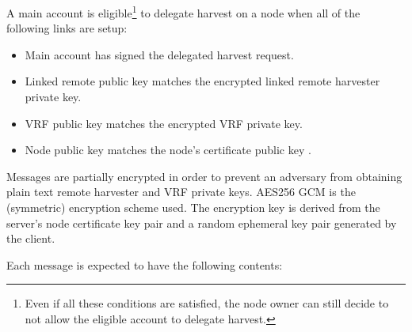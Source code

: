 A main account is eligible\footnote{
	Even if all these conditions are satisfied, the node owner can still decide to not allow the eligible account to delegate harvest.
} to delegate harvest on a node when all of the following links are setup:
\begin{itemize}
	\item{Main account has signed the delegated harvest request.}
	\item{Linked remote public key matches the encrypted linked remote harvester private key.}
	\item{VRF public key matches the encrypted VRF private key.}
	\item{Node public key matches the node's certificate public key .}
\end{itemize}

Messages are partially encrypted in order to prevent an adversary from obtaining plain text remote harvester and VRF private keys.
AES256 GCM is the (symmetric) encryption scheme used.
The encryption key is derived from the server's node certificate key pair and a random ephemeral key pair generated by the client.

Each message is expected to have the following contents:
\begin{table}[ht]
\end{table}


